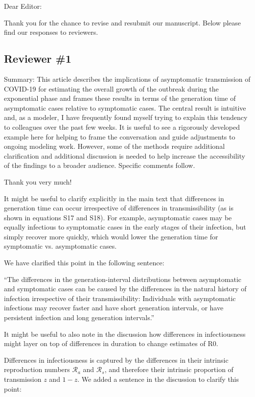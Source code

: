 \documentclass[12pt]{article}
\newcommand{\rev}{\subsection*}
\newcommand{\revtext}{\textsf}
\begin{document}
\noindent Dear Editor:

Thank you for the chance to revise and resubmit our manuscript. 
Below please find our responses to reviewers.

\rev{Reviewer \#1}

\revtext{Summary: This article describes the implications of asymptomatic transmission of COVID-19 for estimating the overall growth of the outbreak during the exponential phase and frames these results in terms of the generation time of asymptomatic cases relative to symptomatic cases.  The central result is intuitive and, as a modeler, I have frequently found myself trying to explain this tendency to colleagues over the past few weeks.  It is useful to see a rigorously developed example here for helping to frame the conversation and guide adjustments to ongoing modeling work.  However, some of the methods require additional clarification and additional discussion is needed to help increase the accessibility of the findings to a broader audience. Specific comments follow.}

Thank you very much!

\revtext{It might be useful to clarify explicitly in the main text that differences in generation time can occur irrespective of differences in transmissibility (as is shown in equations S17 and S18).  For example, asymptomatic cases may be equally infectious to symptomatic cases in the early stages of their infection, but simply recover more quickly, which would lower the generation time for symptomatic vs. asymptomatic cases.}  

We have clarified this point in the following sentence:

``The differences in the generation-interval distributions between asymptomatic and symptomatic cases can be caused by the differences in the natural history of infection irrespective of their transmissibility:
Individuals with asymptomatic infections may recover faster and have short generation intervals, or have persistent infection and long generation intervals.''

\revtext{It might be useful to also note in the discussion how differences in infectiousness might layer on top of differences in duration to change estimates of R0.} 

Differences in infectiousness is captured by the differences in their intrinsic reproduction numbers $\mathcal R_a$ and $\mathcal R_s$, and therefore their intrinsic proportion of transmission $z$ and $1-z$. We added a sentence in the discussion to clarify this point:
\end{document}
